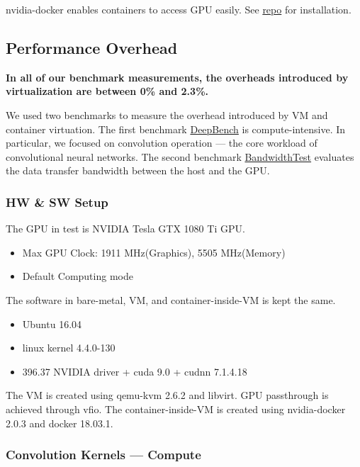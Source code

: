 nvidia-docker enables containers to access GPU easily. See
\href{https://github.com/junjuew/ansible-dotfiles/}{repo} for
installation.

\subsection{Performance Overhead}\label{performance-overhead}

\textbf{In all of our benchmark measurements, the overheads introduced
by virtualization are between 0\% and 2.3\%.}

We used two benchmarks to measure the overhead introduced by VM and
container virtuation. The first benchmark
\href{https://github.com/baidu-research/DeepBench}{DeepBench} is
compute-intensive. In particular, we focused on convolution operation
--- the core workload of convolutional neural networks. The second
benchmark
\href{https://github.com/parallel-forall/code-samples/blob/master/series/cuda-cpp/optimize-data-transfers/bandwidthtest.cu}{BandwidthTest}
evaluates the data transfer bandwidth between the host and the GPU.

\subsubsection{HW \& SW Setup}\label{hw-sw-setup}

The GPU in test is NVIDIA Tesla GTX 1080 Ti GPU.

\begin{itemize}
\tightlist
\item
  Max GPU Clock: 1911 MHz(Graphics), 5505 MHz(Memory)
\item
  Default Computing mode
\end{itemize}

The software in bare-metal, VM, and container-inside-VM is kept the
same.

\begin{itemize}
\tightlist
\item
  Ubuntu 16.04
\item
  linux kernel 4.4.0-130
\item
  396.37 NVIDIA driver + cuda 9.0 + cudnn 7.1.4.18
\end{itemize}

The VM is created using qemu-kvm 2.6.2 and libvirt. GPU passthrough is
achieved through vfio. The container-inside-VM is created using
nvidia-docker 2.0.3 and docker 18.03.1.

\subsubsection{Convolution Kernels ---
Compute}\label{convolution-kernels-compute}

